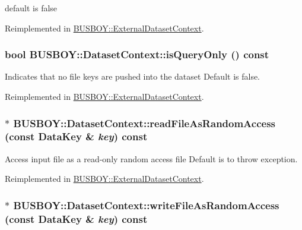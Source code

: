 default is false 

Reimplemented in \hyperlink{classBUSBOY_1_1ExternalDatasetContext_a6fef256e1e09e3bbed17daec4fbbed7b}{BUSBOY::ExternalDatasetContext}.\hypertarget{classBUSBOY_1_1DatasetContext_a934ce529a4ae4cced154260714bbd380}{
\subsubsection[{isQueryOnly}]{\setlength{\rightskip}{0pt plus 5cm}bool BUSBOY::DatasetContext::isQueryOnly () const}}
\label{classBUSBOY_1_1DatasetContext_a934ce529a4ae4cced154260714bbd380}


Indicates that no file keys are pushed into the dataset Default is false. 

Reimplemented in \hyperlink{classBUSBOY_1_1ExternalDatasetContext_a85d83f0dffb7e0fbd8899de1abd28e85}{BUSBOY::ExternalDatasetContext}.\hypertarget{classBUSBOY_1_1DatasetContext_a371cee56375e6052f1626a525bc35a61}{
\subsubsection[{readFileAsRandomAccess}]{ $\ast$ BUSBOY::DatasetContext::readFileAsRandomAccess (const {\bf DataKey} \& {\em key}) const}}
\label{classBUSBOY_1_1DatasetContext_a371cee56375e6052f1626a525bc35a61}


Access input file as a read-\/only random access file Default is to throw exception. 

Reimplemented in \hyperlink{classBUSBOY_1_1ExternalDatasetContext_a6379574013a2236a9efba6a823a7a741}{BUSBOY::ExternalDatasetContext}.\hypertarget{classBUSBOY_1_1DatasetContext_a9137476c998215cdd6e1434c4325c154}{
\subsubsection[{writeFileAsRandomAccess}]{ $\ast$ BUSBOY::DatasetContext::writeFileAsRandomAccess (const {\bf DataKey} \& {\em key}) const}}
\label{classBUSBOY_1_1DatasetContext_a9137476c998215cdd6e1434c4325c154}


